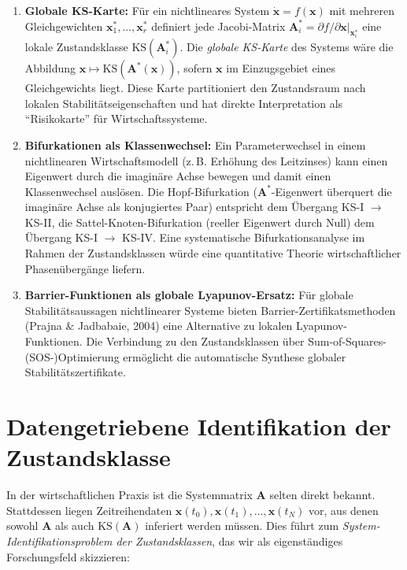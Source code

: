 ﻿\documentclass[12pt, a4paper, titlepage]{report}
\theoremstyle{definition}
\theoremstyle{remark}
\newcommand{\vx}{\bm{x}}
\newcommand{\vA}{\bm{A}}
\newcommand{\KS}{\mathrm{KS}}
\begin{document}
\begin{enumerate}[label=\textbf{A\arabic*.}]
  \item \textbf{Globale KS-Karte:} Für ein nichtlineares System $\dot{\vx} = f(\vx)$
    mit mehreren Gleichgewichten $\vx_1^*, \ldots, \vx_r^*$ definiert jede
    Jacobi-Matrix $\vA_i^* = \partial f/\partial\vx|_{\vx_i^*}$ eine lokale
    Zustandsklasse $\KS(\vA_i^*)$. Die \emph{globale KS-Karte} des Systems wäre
    die Abbildung $\vx \mapsto \KS(\vA^*(\vx))$, sofern $\vx$ im Einzugsgebiet
    eines Gleichgewichts liegt. Diese Karte partitioniert den Zustandsraum nach
    lokalen Stabilitätseigenschaften und hat direkte Interpretation als ``Risikokarte''
    für Wirtschaftssysteme.

  \item \textbf{Bifurkationen als Klassenwechsel:} Ein Parameterwechsel in einem
    nichtlinearen Wirtschaftsmodell (z.\,B. Erhöhung des Leitzinses) kann einen
    Eigenwert durch die imaginäre Achse bewegen und damit einen Klassenwechsel
    auslösen. Die Hopf-Bifurkation ($\vA^*$-Eigenwert überquert die imaginäre Achse
    als konjugiertes Paar) entspricht dem Übergang KS-I $\to$ KS-II, die
    Sattel-Knoten-Bifurkation (reeller Eigenwert durch Null) dem Übergang KS-I $\to$ KS-IV.
    Eine systematische Bifurkationsanalyse im Rahmen der Zustandsklassen würde eine
    quantitative Theorie wirtschaftlicher Phasenübergänge liefern.

  \item \textbf{Barrier-Funktionen als globale Lyapunov-Ersatz:} Für globale
    Stabilitätsaussagen nichtlinearer Systeme bieten Barrier-Zertifikatsmethoden
    (Prajna \& Jadbabaie, 2004) eine Alternative zu lokalen Lyapunov-Funktionen.
    Die Verbindung zu den Zustandsklassen über Sum-of-Squares-(SOS-)Optimierung
    ermöglicht die automatische Synthese globaler Stabilitätszertifikate.
\end{enumerate}

\section{Datengetriebene Identifikation der Zustandsklasse}
\label{subsec:datengetrieben}

In der wirtschaftlichen Praxis ist die Systemmatrix $\vA$ selten direkt bekannt.
Stattdessen liegen Zeitreihendaten $\vx(t_0), \vx(t_1), \ldots, \vx(t_N)$ vor,
aus denen sowohl $\vA$ als auch $\KS(\vA)$ inferiert werden müssen. Dies führt zum
\emph{System-Identifikationsproblem der Zustandsklassen}, das wir als
eigenständiges Forschungsfeld skizzieren:
\end{document}
